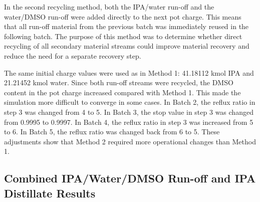 In the second recycling method, both the IPA/water run-off and the
water/DMSO run-off were added directly to the next pot charge. This
means that all run-off material from the previous batch was immediately
reused in the following batch. The purpose of this method was to
determine whether direct recycling of all secondary material streams
could improve material recovery and reduce the need for a separate
recovery step.

The same initial charge values were used as in Method 1: 41.18112 kmol
IPA and 21.21452 kmol water. Since both run-off streams were recycled,
the DMSO content in the pot charge increased compared with Method 1.
This made the simulation more difficult to converge in some cases. In
Batch 2, the reflux ratio in step 3 was changed from 4 to 5. In Batch 3,
the stop value in step 3 was changed from 0.9995 to 0.9997. In Batch 4,
the reflux ratio in step 3 was increased from 5 to 6. In Batch 5, the
reflux ratio was changed back from 6 to 5. These adjustments show that
Method 2 required more operational changes than Method 1.

\subsection{Combined IPA/Water/DMSO Run-off and IPA Distillate
Results}\label{combined-ipawaterdmso-run-off-and-ipa-distillate-results}

